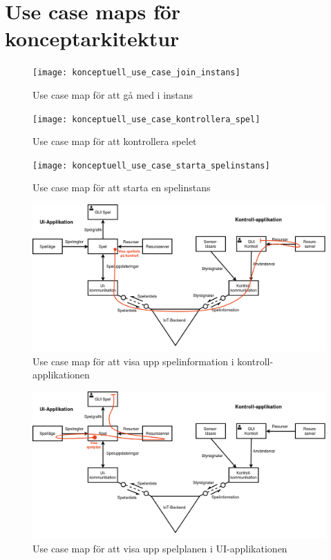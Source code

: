 \section{Use case maps för konceptarkitektur}
\label{sec:use_case_koncept}

\begin{figure}[h]
    \centering
    \texttt{[image: konceptuell\_use\_case\_join\_instans]}
    \caption{Use case map för att gå med i instans}
    \label{fig:use_case_koncept_join}
\end{figure}

\begin{figure}[h]
    \centering
    \texttt{[image: konceptuell\_use\_case\_kontrollera\_spel]}
    \caption{Use case map för att kontrollera spelet}
    \label{fig:use_case_koncept_kontrollera}
\end{figure}

\begin{figure}[h]
    \centering
    \texttt{[image: konceptuell\_use\_case\_starta\_spelinstans]}
    \caption{Use case map för att starta en spelinstans}
    \label{fig:use_case_koncept_starta_instans}
\end{figure}

\begin{figure}[h]
    \centering
    \includegraphics[scale=0.4]{images/konceptuell_use_case_visa_spelinfo}
    \caption{Use case map för att visa upp spelinformation i kontroll-applikationen}
    \label{fig:use_case_koncept_visa_spelinfo}
\end{figure}

\begin{figure}[h]
    \centering
    \includegraphics[scale=0.4]{images/konceptuell_use_case_visa_spelplan}
    \caption{Use case map för att visa upp spelplanen i UI-applikationen}
    \label{fig:use_case_koncept_visa_spelplan}
\end{figure}
